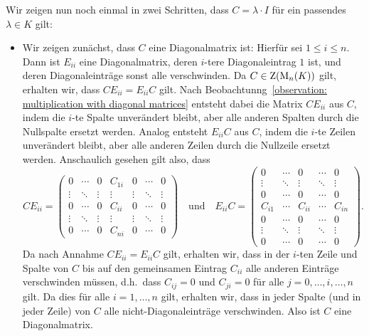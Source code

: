 Wir zeigen nun noch einmal in zwei Schritten, dass $C = \lambda \cdot I$ für ein passendes $\lambda \in K$ gilt:
\begin{itemize}
  \item
    Wir zeigen zunächst, dass $C$ eine Diagonalmatrix ist:
    Hierfür sei $1 \leq i \leq n$.
    Dann ist $E_{ii}$ eine Diagonalmatrix, deren $i$-tere Diagonaleintrag $1$ ist, und deren Diagonaleinträge sonst alle verschwinden.
    Da $C \in \operatorname{Z}(\operatorname{M}_{n}(K))$ gilt, erhalten wir, dass $C E_{ii} = E_{ii} C$ gilt.
    Nach Beobachtunng~\ref{observation: multiplication with diagonal matrices} entsteht dabei die Matrix $C E_{ii}$ aus $C$, indem die $i$-te Spalte unverändert bleibt, aber alle anderen Spalten durch die Nullspalte ersetzt werden.
    Analog entsteht $E_{ii} C$ aus $C$, indem die $i$-te Zeilen unverändert bleibt, aber alle anderen Zeilen durch die Nullzeile ersetzt werden.
    Anschaulich gesehen gilt also, dass
    \[
      C E_{ii}
      =
      \begin{pmatrix}
        0       & \cdots  & 0       & C_{1i}    & 0       & \cdots  & 0       \\
        \vdots  & \ddots  & \vdots  & \vdots    & \vdots  & \ddots  & \vdots  \\
        0       & \cdots  & 0       & C_{ii}    & 0       & \cdots  & 0       \\
        \vdots  & \ddots  & \vdots  & \vdots    & \vdots  & \ddots  & \vdots  \\
        0       & \cdots  & 0       & C_{ni}    & 0       & \cdots  & 0
      \end{pmatrix}
      \quad\text{und}\quad
      E_{ii} C
      = \begin{pmatrix}
        0       & \cdots  & 0       & \cdots  & 0       \\
        \vdots  & \ddots  & \vdots  & \ddots  & \vdots  \\
        0       & \cdots  & 0       & \cdots  & 0       \\
        C_{i1}  & \cdots  & C_{ii}  & \cdots  & C_{in}  \\
        0       & \cdots  & 0       & \cdots  & 0       \\
        \vdots  & \ddots  & \vdots  & \ddots  & \vdots  \\
        0       & \cdots  & 0       & \cdots  & 0
      \end{pmatrix}.
    \]
    Da nach Annahme $C E_{ii} = E_{ii} C$ gilt, erhalten wir, dass in der $i$-ten Zeile und Spalte von $C$ bis auf den gemeinsamen Eintrag $C_{ii}$ alle anderen Einträge verschwinden müssen, d.h.\ dass $C_{ij} = 0$ und $C_{ji} = 0$ für alle $j = 0, \dotsc, \hat{i}, \dotsc, n$ gilt.
    Da dies für alle $i = 1, \dotsc, n$ gilt, erhalten wir, dass in jeder Spalte (und in jeder Zeile) von $C$ alle nicht-Diagonaleinträge verschwinden.
    Also ist $C$ eine Diagonalmatrix.
    

\end{itemize}
